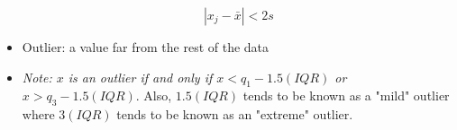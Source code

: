 \documentclass[12pt]{article}
\begin{document}
\begin{itemize}
        \[
        | x_j - \bar{x}| < 2s
        \] 
    \begin{center}
    \end{center}
        \item Outlier: a value far from the rest of the data
        \item[] \textit{Note: $x$ is an outlier if and only if $x < q_1 - 1.5(IQR)$ or $x > q_3 - 1.5(IQR)$}. Also, $1.5(IQR)$ tends to be known as a "mild" outlier where $3(IQR)$ tends to be known as an "extreme" outlier.
    \end{itemize}
    
\end{document}
